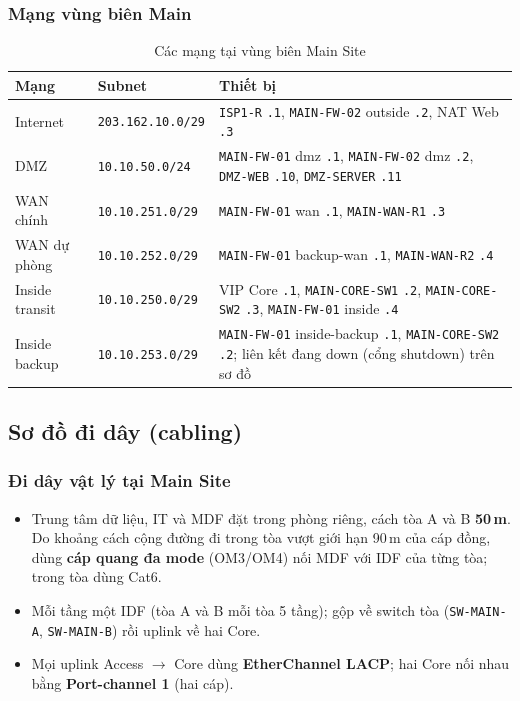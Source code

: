 \subsubsection{Mạng vùng biên Main}
\begin{small}
\setlength{\tabcolsep}{4pt}
\begin{longtable}{|p{3.2cm}|p{2.8cm}|p{7.8cm}|}
\caption{Các mạng tại vùng biên Main Site} \label{tab:edge_nets} \\
\hline
\textbf{Mạng} & \textbf{Subnet} & \textbf{Thiết bị} \\ \hline
\endhead
Internet & \texttt{203.162.10.0/29} & \texttt{ISP1-R} \texttt{.1}, \texttt{MAIN-FW-02} outside \texttt{.2}, NAT Web \texttt{.3} \\ \hline
DMZ & \texttt{10.10.50.0/24} & \texttt{MAIN-FW-01} dmz \texttt{.1}, \texttt{MAIN-FW-02} dmz \texttt{.2}, \texttt{DMZ-WEB} \texttt{.10}, \texttt{DMZ-SERVER} \texttt{.11} \\ \hline
WAN chính & \texttt{10.10.251.0/29} & \texttt{MAIN-FW-01} wan \texttt{.1}, \texttt{MAIN-WAN-R1} \texttt{.3} \\ \hline
WAN dự phòng & \texttt{10.10.252.0/29} & \texttt{MAIN-FW-01} backup-wan \texttt{.1}, \texttt{MAIN-WAN-R2} \texttt{.4} \\ \hline
Inside transit & \texttt{10.10.250.0/29} & VIP Core \texttt{.1}, \texttt{MAIN-CORE-SW1} \texttt{.2}, \texttt{MAIN-CORE-SW2} \texttt{.3}, \texttt{MAIN-FW-01} inside \texttt{.4} \\ \hline
Inside backup & \texttt{10.10.253.0/29} & \texttt{MAIN-FW-01} inside-backup \texttt{.1}, \texttt{MAIN-CORE-SW2} \texttt{.2}; liên kết đang down (cổng shutdown) trên sơ đồ \\ \hline
\end{longtable}
\end{small}

\subsection{Sơ đồ đi dây (cabling)}

\subsubsection{Đi dây vật lý tại Main Site}
\begin{itemize}[noitemsep,topsep=2pt]
    \item Trung tâm dữ liệu, IT và MDF đặt trong phòng riêng, cách tòa A và B \textbf{50\,m}. Do khoảng cách cộng đường đi trong tòa vượt giới hạn 90\,m của cáp đồng, dùng \textbf{cáp quang đa mode} (OM3/OM4) nối MDF với IDF của từng tòa; trong tòa dùng Cat6.
    \item Mỗi tầng một IDF (tòa A và B mỗi tòa 5 tầng); gộp về switch tòa (\texttt{SW-MAIN-A}, \texttt{SW-MAIN-B}) rồi uplink về hai Core.
    \item Mọi uplink Access $\to$ Core dùng \textbf{EtherChannel LACP}; hai Core nối nhau bằng \textbf{Port-channel 1} (hai cáp).
\end{itemize}

